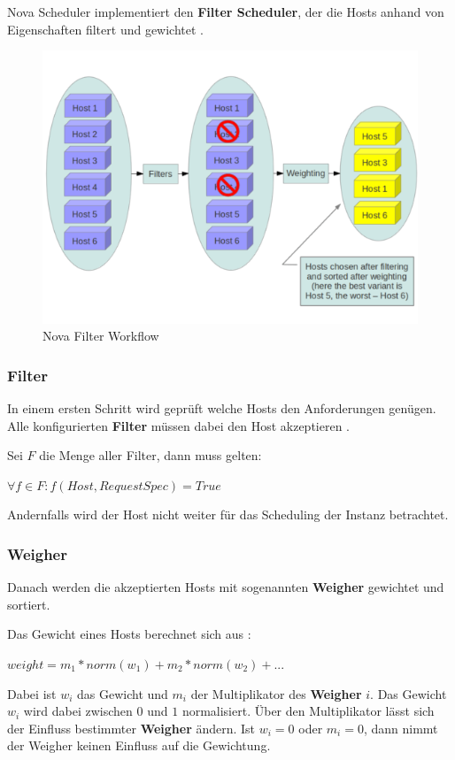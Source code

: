 \documentclass[../Main.tex]{subfiles}
\begin{document}
Nova Scheduler implementiert den \textbf{Filter Scheduler}, der die Hosts anhand von Eigenschaften filtert
und gewichtet \citep{ComputeSchedulers}.
\begin{figure}[h]
    \centering
    \includegraphics[width=0.9\columnwidth]{Images/NovaFilterWorkflow.png}
    \caption{Nova Filter Workflow \citep{ComputeSchedulers}}
\end{figure}

\subsubsection{Filter}

In einem ersten Schritt wird geprüft welche Hosts den Anforderungen
genügen. Alle konfigurierten \textbf{Filter} müssen dabei den Host akzeptieren \citep{ComputeSchedulers}.

Sei $F$ die Menge aller Filter, dann muss gelten:

\begin{center}
    $\forall f \in F: f(Host, RequestSpec) = True$
\end{center}

Andernfalls wird der Host nicht weiter
für das Scheduling der Instanz betrachtet.

\subsubsection{Weigher}
\label{chapter:Weigher}

Danach werden die akzeptierten Hosts mit sogenannten \textbf{Weigher} gewichtet und sortiert.

Das Gewicht eines Hosts berechnet sich aus \citep{NormalizedWeights}:
\begin{center}
    $weight = m_1 * norm(w_1) + m_2 * norm(w_2) + ...$
\end{center}
Dabei ist $w_i$ das Gewicht und $m_i$ der Multiplikator des \textbf{Weigher} $i$. Das Gewicht
$w_i$ wird dabei zwischen $0$ und $1$ normalisiert. Über den Multiplikator lässt sich der Einfluss
bestimmter \textbf{Weigher} ändern. Ist $w_i = 0$ oder $m_i= 0$, dann nimmt der Weigher keinen Einfluss
auf die Gewichtung.
\end{document}
